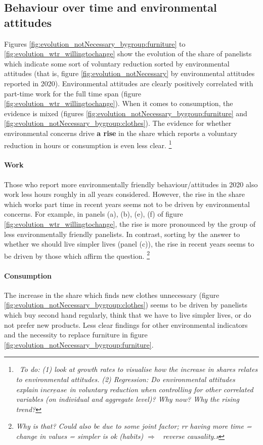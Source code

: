 \documentclass[12pt]{article}
\newcommand{\ar}{$\Rightarrow$ \ }
\begin{document}
\subsection{Behaviour over time and environmental attitudes}\label{subsec:bt}
Figures \ref{fig:evolution_notNecessary_bygroup:furniture} to \ref{fig:evolution_wtr_willingtochange} show the evolution of the share of panelists which indicate some sort of voluntary reduction sorted by environmental attitudes (that is, figure \ref{fig:evolution_notNecessary} by environmental attitudes reported in 2020). 
Environmental attitudes are clearly positively correlated with part-time work for the full time span (figure \ref{fig:evolution_wtr_willingtochange}).
When it comes to consumption, the evidence is mixed (figures \ref{fig:evolution_notNecessary_bygroup:furniture} and \ref{fig:evolution_notNecessary_bygroup:clothes}). The evidence for whether environmental concerns drive \textbf{a rise} in the share which reports a voluntary reduction in hours or consumption is even less clear. \footnote{\ \textit{To do: (1) look at growth rates to visualise how the increase in shares relates to environmental attitudes.} \textit{(2) Regression: Do environmental attitudes explain $\underline{increase}$ in voluntary reduction when controlling for other correlated variables (on individual and aggregate level)? Why now? Why the rising trend?} }

\paragraph{Work} Those who report more environmentally friendly behaviour/attitudes in 2020 also work less hours roughly in all years considered. 
However, the rise in the share which works part time in recent years seems not to be driven by environmental concerns.
For example, in panels (a), (b), (e), (f) of figure \ref{fig:evolution_wtr_willingtochange}, the rise is more pronounced by the group of less environmentally friendly panelists. In contrast, sorting by the answer to whether we should live simpler lives (panel (c)), the rise in recent years seems to be driven by those which affirm the question. \footnote{\textit{Why is that? Could also be due to some joint factor; rr having more time = change in values = simpler is ok (habits) \ar reverse causality.s}}

\paragraph{Consumption}
The increase in the share which finds new clothes unnecessary (figure \ref{fig:evolution_notNecessary_bygroup:clothes}) seems to be driven by panelists which buy second hand regularly, think that we have to live simpler lives, or do not prefer new products. Less clear findings for other environmental indicators and the necessity to replace furniture in figure \ref{fig:evolution_notNecessary_bygroup:furniture}. 
\end{document}
